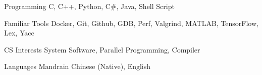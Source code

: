 

\begin{cvskills}

  \cvskill
    {Programming} %
    {C, C++, Python, C\#, Java, Shell Script} %

  \cvskill
    {Familiar Tools} %
    {Docker, Git, Github, GDB, Perf, Valgrind, MATLAB, TensorFlow, Lex, Yacc} %

  \cvskill
    {CS Interests} %
    {System Software, Parallel Programming, Compiler} %

  \cvskill
    {Languages} %
    {Mandrain Chinese (Native), English} %

\end{cvskills}
